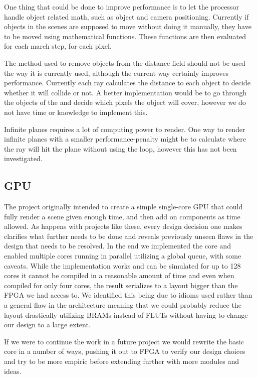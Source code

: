 			One thing that could be done to improve performance is to let the
			processor handle object related math, such as object and camera 
			positioning. Currently if objects in the scenes are supposed to 
			move without doing it manually, they have to be moved using 
			mathematical functions. These functions are then evaluated for 
			each march step, for each pixel.

			The method used to remove objects from the distance field should
			not be used the way it is currently used, although the current way
			certainly improves performance. Currently each ray calculates the
			distance to each object to decide whether it will collide or not. 
			A better implementation would be to go through the objects of the 
			and decide which pixels the object will cover, however we do not
			have time or knowledge to implement this. 

			Infinite planes requires a lot of computing power to render. One 
			way to render infinite planes with a smaller performance-penalty 
			might be to calculate where the ray will hit the plane without 
			using the loop, however this has not been investigated. 


		
		\subsection{GPU} 
		
			The project originally intended to create a simple single-core GPU
			that could fully render a scene given enough time, and then add on
			components as time allowed. As happens with projects like these,
			every design decision one makes clarifies what further needs to be
			done and reveals previously unseen flaws in the design that needs
			to be resolved. In the end we implemented the core and enabled
			multiple cores running in parallel utilizing a global queue, with
			some caveats. While the implementation works and can be simulated
			for up to 128 cores it cannot be compiled in a reasonable amount of
			time and even when compiled for only four cores, the result
			serializes to a layout bigger than the FPGA we had access to. We
			identified this being due to idioms used rather than a general flaw
			in the architecture meaning that we could probably reduce the
			layout drastically utilizing BRAMs instead of FLUTs without having
			to change our design to a large extent. 
			
			If we were to continue the work in a future project we would
			rewrite the basic core in a number of ways, pushing it out to FPGA
			to verify our design choices and try to be more empiric before
			extending further with more modules and ideas. 
